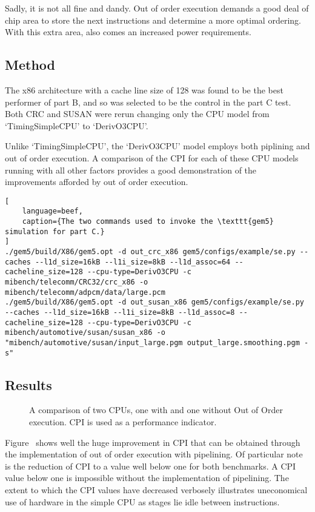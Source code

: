 Sadly, it is not all fine and dandy. Out of order execution demands a good
deal of chip area to store the next instructions and determine a more optimal
ordering. With this extra area, also comes an increased power requirements.

\subsection{Method}

The x86 architecture with a cache line size of 128 was found to be the best
performer of part B, and so was selected to be the control in the part C test.
Both CRC and SUSAN were rerun changing only the CPU model from `TimingSimpleCPU'
to `DerivO3CPU'.

Unlike `TimingSimpleCPU', the `DerivO3CPU' model employs both piplining and out
of order execution. A comparison of the CPI for each of these CPU models running
with all other factors provides a good demonstration of the improvements
afforded by out of order execution.

\begin{lstlisting}[
    language=beef,
    caption={The two commands used to invoke the \texttt{gem5} simulation for part C.}
]
./gem5/build/X86/gem5.opt -d out_crc_x86 gem5/configs/example/se.py --caches --l1d_size=16kB --l1i_size=8kB --l1d_assoc=64 --cacheline_size=128 --cpu-type=DerivO3CPU -c mibench/telecomm/CRC32/crc_x86 -o mibench/telecomm/adpcm/data/large.pcm
./gem5/build/X86/gem5.opt -d out_susan_x86 gem5/configs/example/se.py --caches --l1d_size=16kB --l1i_size=8kB --l1d_assoc=8 --cacheline_size=128 --cpu-type=DerivO3CPU -c mibench/automotive/susan/susan_x86 -o "mibench/automotive/susan/input_large.pgm output_large.smoothing.pgm -s"
\end{lstlisting}


\subsection{Results}
\begin{figure}[H]
    \centering
    
    \caption{
        A comparison of two CPUs, one with and one without Out of Order
    execution. CPI is used as a performance indicator.
    }
    \label{fig:partc-cpi}
\end{figure}

Figure~\label{fig:partc-cpi} shows well the huge improvement in CPI that can be
obtained through the implementation of out of order execution with pipelining.
Of particular note is the reduction of CPI to a value well below one for both
benchmarks. A CPI value below one is impossible without the implementation of
pipelining.
The extent to which the CPI values have decreased verbosely illustrates
uneconomical use of hardware in the simple CPU as stages lie idle between
instructions.

